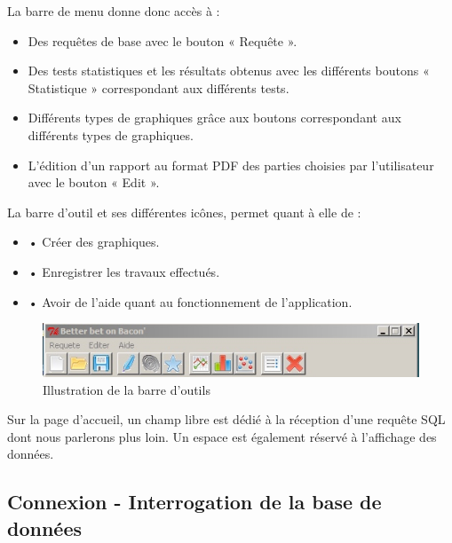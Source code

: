 \documentclass[a4paper,10pt]{report}
\begin{document}
La barre de menu donne donc accès à :

\begin{itemize}

\item Des requêtes de base avec le bouton « Requête ».

\item Des tests statistiques et les résultats obtenus avec les différents boutons « Statistique » correspondant aux différents tests. 

\item Différents types de graphiques grâce aux boutons correspondant aux différents types de graphiques.

\item L’édition d’un rapport au format PDF des parties choisies par l'utilisateur avec le bouton « Edit ».

\end{itemize} 

La barre d’outil et ses différentes icônes, permet quant à elle de :

\begin{itemize}

\item • Créer des graphiques.

\item • Enregistrer les travaux effectués.

\item • Avoir de l'aide quant au fonctionnement de l'application.

\end{itemize}


\begin{figure}[H]

\centering
\includegraphics[scale=0.6]{barre.jpg}
\caption{Illustration de la barre d'outils}

\end{figure} 


Sur la page d’accueil, un champ libre est dédié à la réception d’une requête SQL dont nous parlerons plus loin. Un espace est également réservé à l’affichage des données.


\subsection{Connexion - Interrogation de la base de données}
\end{document}
